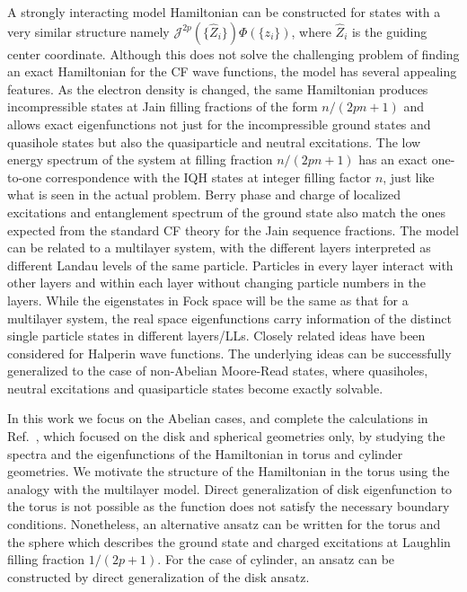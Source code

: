 \documentclass[prb,aps,epsfig,longbibliography,twocolumn]{revtex4-1}
\begin{document}
A strongly interacting model Hamiltonian can be constructed for states with a very similar structure namely $\mathcal{J}^{2p}(\{\hat{Z}_i\})\Phi(\{z_i\})$, where $\hat{Z}_i$ is the guiding center coordinate.\cite{Anand20} Although this does not solve the challenging problem of finding an exact Hamiltonian for the CF wave functions, the model has several appealing features.
%
As the electron density is changed, the same Hamiltonian produces incompressible states at Jain filling fractions of the form $n/(2pn+1)$ and allows exact eigenfunctions not just for the incompressible ground states and quasihole states but also the quasiparticle and neutral excitations. The low energy spectrum of the system at filling fraction $n/(2pn+1)$ has an exact one-to-one correspondence with the IQH states at integer filling factor $n$, just like what is seen in the actual problem. Berry phase and charge of localized excitations and entanglement spectrum of the ground state also match the ones expected from the standard CF theory for the Jain sequence fractions.
%
The model can be related to a multilayer system, with the different layers interpreted as different Landau levels of the same particle. Particles in every layer interact with other layers and within each layer without changing particle numbers in the layers. While the eigenstates in Fock space will be the same as that for a multilayer system, the real space eigenfunctions carry information of the distinct single particle states in different layers/LLs. Closely related ideas have been considered for Halperin wave functions.\cite{Papic2010, Goerbig2010} 
%
The underlying ideas can be successfully generalized to the case of non-Abelian Moore-Read states, where quasiholes, neutral excitations and quasiparticle states\cite{PhysRevLett.107.086806,Sreejith11,Sreejith13} become exactly solvable.\cite{Koji22}

In this work we focus on the Abelian cases, and complete the calculations in Ref.~, which focused on the disk and spherical geometries only, by studying the spectra and the eigenfunctions of the Hamiltonian in torus and cylinder geometries. We motivate the structure of the Hamiltonian in the torus using the analogy with the multilayer model. Direct generalization of disk eigenfunction to the torus is not possible as the function does not satisfy the necessary boundary conditions. Nonetheless, an alternative ansatz can be written for the torus and the sphere which describes the ground state and charged excitations at Laughlin filling fraction $1/(2p+1)$. For the case of cylinder, an ansatz can be constructed by direct generalization of the disk ansatz.
\end{document}

